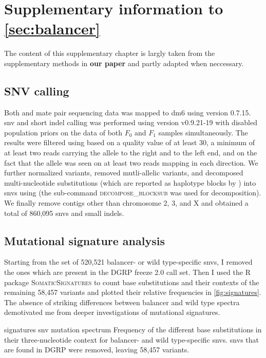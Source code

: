 \chapter{Supplementary information to \texorpdfstring{\cref{sec:balancer}}{the balancer project}}
\label{sec:suppl_balancer}


The content of this supplementary chapter is largly taken from the supplementary
methods in \textbf{our paper} and partly adapted when
neccessary.

\section{SNV calling}
\label{sec:suppl_snv}

Both \wgs and mate pair sequencing data was mapped to
\ac{dm6} using \bwamem version 0.7.15. \Ac{snv} and short indel calling was
performed using \freebayes version v0.9.21-19 with disabled population priors on
the \wgs data of both $F_0$ and $F_1$ samples simultaneously. The results were
filtered using \vcflib based on a quality value of at least 30,
a minimum of at least two reads carrying the allele to the right and to the left
end, and on the fact that the allele was seen on at least two reads mapping in
each direction. We further normalized variants, removed mutli-allelic variants,
and decomposed multi-nucleotide substitutions (which are reported as haplotype
blocks by \freebayes) into \acp{snv} using \vt (the sub-command \textsc{decompose\_blocksub}
was used for decomposition). We finally remove contigs other than chromosome 2,
3, and X and obtained a total of 860,095 \acp{snv} and small indels.



\section{Mutational signature analysis}
\label{sec:suppl_mutsign}

Starting from the set of 520,521 balancer- or wild type-specific \acp{snv},
I removed the ones which are present in the DGRP freeze 2.0 \snv call set.
Then I used the R package \textsc{SomaticSignatures} \citep{Gehring2015} to
count base substitutions and their contexts of the remaining 58,457 variants
and plotted their relative frequencies in \cref{fig:signatures}. The absence
of striking differences between balancer and wild type spectra demotivated me
from deeper investigations of mutational signatures.

    {signatures}
    {\Ac{snv} mutation spectrum}
    {Frequency of the different
     base substitutions in their three-nucleotide context for balancer- and
     wild type-specific \acp{snv}. \Acp{snv} that are found in DGRP were
     removed, leaving 58,457 variants.}




